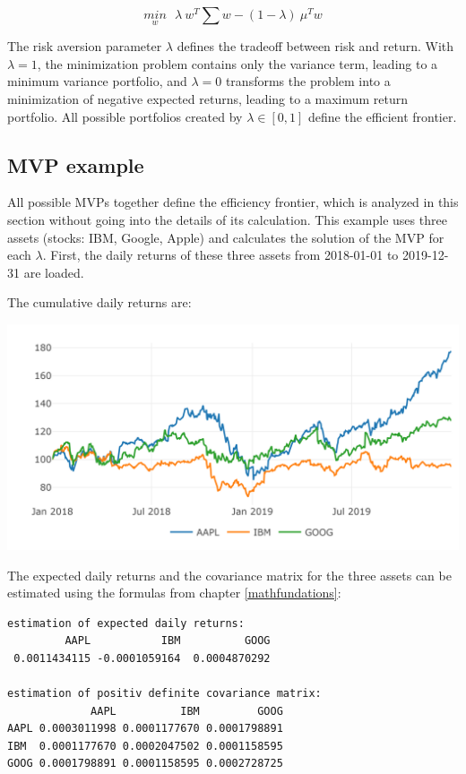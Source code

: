\documentclass[
  oneside]{book}
\begin{document}
\begin{equation} 
\underset{w}{min} \ \ \ \lambda \ w^T \textstyle\sum w - (1-\lambda) \ \mu^T w
\label{eq:MVP}
\end{equation}

The risk aversion parameter \(\lambda\) defines the tradeoff between risk and return. With \(\lambda = 1\), the minimization problem contains only the variance term, leading to a minimum variance portfolio, and \(\lambda = 0\) transforms the problem into a minimization of negative expected returns, leading to a maximum return portfolio. All possible portfolios created by \(\lambda \in [0, 1]\) define the efficient frontier.

\hypertarget{mvp-example}{%
\subsection{MVP example}\label{mvp-example}}

All possible MVPs together define the efficiency frontier, which is analyzed in this section without going into the details of its calculation. This example uses three assets (stocks: IBM, Google, Apple) and calculates the solution of the MVP for each \(\lambda\). First, the daily returns of these three assets from 2018-01-01 to 2019-12-31 are loaded.

The cumulative daily returns are:

\includegraphics{Master_Thesis_files/figure-latex/MVP_ex2-1.png}

The expected daily returns and the covariance matrix for the three assets can be estimated using the formulas from chapter \ref{mathfundations}:

\begin{verbatim}
estimation of expected daily returns:
         AAPL           IBM          GOOG 
 0.0011434115 -0.0001059164  0.0004870292 

estimation of positiv definite covariance matrix:
             AAPL          IBM         GOOG
AAPL 0.0003011998 0.0001177670 0.0001798891
IBM  0.0001177670 0.0002047502 0.0001158595
GOOG 0.0001798891 0.0001158595 0.0002728725
\end{verbatim}
\end{document}
